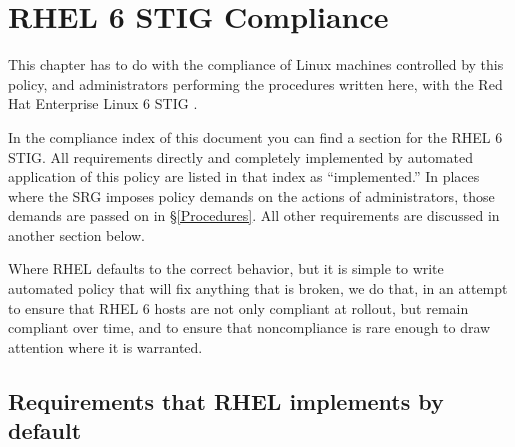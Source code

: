 %
%
%

\chapter{RHEL 6 STIG Compliance}
\label{RHEL6STIGCompliance}

This chapter has to do with the compliance of Linux machines controlled by
this policy, and administrators performing the procedures written here,
with the Red Hat Enterprise Linux 6 STIG \cite{rhel6-stig}.

In the compliance index of this document you can find a section for the RHEL 6 STIG.
All requirements directly and completely implemented by automated
application of this policy are listed in that index as ``implemented.''
In places where the SRG imposes
policy demands on the actions of administrators, those demands are passed
on in \S\ref{Procedures}. All other requirements are discussed in another
section below.

Where RHEL defaults to the correct behavior, but it is simple to write
automated policy that will fix anything that is broken, we do that, in an
attempt to ensure that RHEL 6 hosts are not only compliant at rollout, but
remain compliant over time, and to ensure that noncompliance is rare
enough to draw attention where it is warranted.






\section{Requirements that RHEL implements by default}




